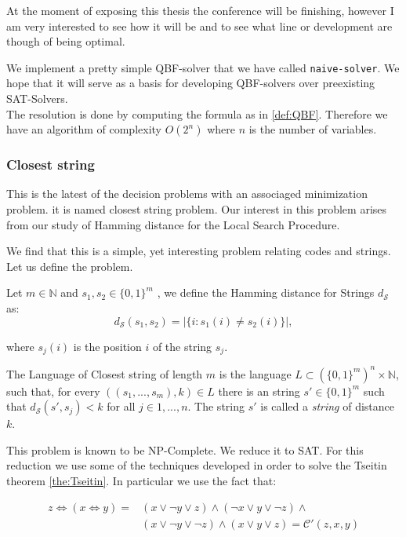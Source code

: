   At the moment of exposing this thesis the conference will be finishing, however I am very interested to see how it will be and to see what line or development are though of being optimal.


We implement a pretty simple QBF-solver that we have called \texttt{naive-solver}. We hope that it will serve as a basis for developing QBF-solvers over preexisting SAT-Solvers.\\

The resolution is done by computing the formula as in \ref{def:QBF}. Therefore we have an algorithm of complexity $O(2^n)$ where $n$ is the number of variables.

\subsubsection{Closest string}

This is the latest of the decision problems with an associaged minimization problem. it is named closest string problem. Our interest in this problem arises from our study of Hamming distance for the Local Search Procedure. 

We find that this is a simple, yet interesting problem relating codes and strings. Let us define the problem.

\begin{definition}
Let $m\in\mathbb{N}$ and $s_1,s_2\in \{0,1\}^m$ , we define the Hamming distance for Strings $d_\mathcal{S}$ as:
$$d_{\mathcal{S}} ( s_1,s_2 ) = |\{ i : s_1(i) \ne s_2(i)\}|,$$

where $s_j(i)$ is the position $i$ of the string $s_j$. 
\end{definition}

\begin{definition}
The Language of Closest string of length $m$ is the language $L\subset \left (\{0,1\}^m \right )^n \times \mathbb{N}$, such that, for every $((s_1,...,s_m), k)\in L$ there is an string $s' \in \{0,1\}^m$ such that $d_\mathcal{S}(s', s_j) <k $ for all $j \in 1,...,n$.  The string $s'$ is called a \emph{string} of distance $k$.
\end{definition}

This problem is known to be NP-Complete\cite{lanctot2003distinguishing}. We reduce it to SAT. For this reduction we use some of the techniques developed in order to solve the Tseitin theorem \ref{the:Tseitin}. In particular we use the fact that:

\begin{equation} \label{aunnosehadormio}
\begin{split}
    z \iff( x \iff y ) =& (x \lor  \neg y \lor z) \land (\neg x \lor y \lor \neg z) \land\\
    &  (x \lor \neg y \lor \neg z) \land (x \lor y \lor z) = \mathcal{C'} (z,x,y)
\end{split}
\end{equation}


